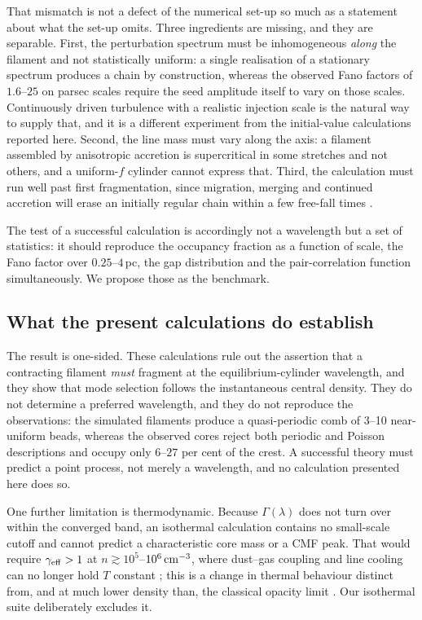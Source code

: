 \documentclass[usenatbib,twoside,twocolumn]{mnras}
\begin{document}
That mismatch is not a defect of the numerical set-up so much as a statement about what the set-up omits. Three ingredients are missing, and they are separable. First, the perturbation spectrum must be inhomogeneous \emph{along} the filament and not statistically uniform: a single realisation of a stationary spectrum produces a chain by construction, whereas the observed Fano factors of $1.6$--$25$ on parsec scales require the seed amplitude itself to vary on those scales. Continuously driven turbulence with a realistic injection scale is the natural way to supply that, and it is a different experiment from the initial-value calculations reported here. Second, the line mass must vary along the axis: a filament assembled by anisotropic accretion is supercritical in some stretches and not others, and a uniform-$f$ cylinder cannot express that. Third, the calculation must run well past first fragmentation, since migration, merging and continued accretion will erase an initially regular chain within a few free-fall times \citep{Clarke2020}.

The test of a successful calculation is accordingly not a wavelength but a set of statistics: it should reproduce the occupancy fraction as a function of scale, the Fano factor over $0.25$--$4$\,pc, the gap distribution and the pair-correlation function simultaneously. We propose those as the benchmark.

\subsection{What the present calculations do establish}
\label{sec:whatestablished}


The result is one-sided. These calculations rule out the assertion that a contracting filament \emph{must} fragment at the equilibrium-cylinder wavelength, and they show that mode selection follows the instantaneous central density. They do not determine a preferred wavelength, and they do not reproduce the observations: the simulated filaments produce a quasi-periodic comb of 3--10 near-uniform beads, whereas the observed cores reject both periodic and Poisson descriptions and occupy only $6$--$27$ per cent of the crest. A successful theory must predict a point process, not merely a wavelength, and no calculation presented here does so.

One further limitation is thermodynamic. Because $\Gamma(\lambda)$ does not turn over within the converged band, an isothermal calculation contains no small-scale cutoff and cannot predict a characteristic core mass or a CMF peak. That would require $\gamma_{\rm eff}>1$ at $n\gtrsim10^{5}$--$10^{6}\,{\rm cm^{-3}}$, where dust--gas coupling and line cooling can no longer hold $T$ constant \citep{Larson1985,Glover2012}; this is a change in thermal behaviour distinct from, and at much lower density than, the classical opacity limit \citep{Rees1976,LowLyndenBell1976}. Our isothermal suite deliberately excludes it.
\end{document}
